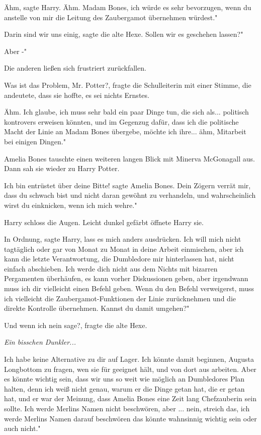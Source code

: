 \glqq{}Ähm\grqq{}, sagte Harry. \glqq{}Ähm. Madam Bones, ich würde es sehr
bevorzugen, wenn du anstelle von mir die Leitung des Zaubergamot übernehmen
würdest."

\glqq{}Darin sind wir uns einig\grqq{}, sagte die alte Hexe. \glqq{}Sollen wir es
geschehen lassen?"

\glqq{}Aber -"

Die anderen ließen sich frustriert zurückfallen.

\glqq{}Was ist das Problem, Mr. Potter?\grqq{}, fragte die Schulleiterin mit
einer Stimme, die andeutete, dass sie hoffte, es sei nichts Ernstes.

\glqq{}Ähm. Ich glaube, ich muss sehr bald ein paar Dinge tun, die sich als...
politisch kontrovers erweisen könnten, und im Gegenzug dafür, dass ich die
politische Macht der Linie an Madam Bones übergebe, möchte ich ihre... ähm,
Mitarbeit bei einigen Dingen."

Amelia Bones tauschte einen weiteren langen Blick mit Minerva McGonagall aus.
Dann sah sie wieder zu Harry Potter.

\glqq{}Ich bin entrüstet über deine Bitte!\grqq{} sagte Amelia Bones. \glqq{}Dein
Zögern verrät mir, dass du schwach bist und nicht daran gewöhnt zu verhandeln,
und wahrscheinlich wirst du einknicken, wenn ich mich wehre."

Harry schloss die Augen. Leicht dunkel gefärbt öffnete Harry sie.

\glqq{}In Ordnung\grqq{}, sagte Harry, \glqq{}lass es mich anders ausdrücken. Ich
will mich nicht tagtäglich oder gar von Monat zu Monat in deine Arbeit
einmischen, aber ich kann die letzte Verantwortung, die Dumbledore mir
hinterlassen hat, nicht einfach abschieben. Ich werde dich nicht aus dem Nichts
mit bizarren Pergamenten überhäufen, es kann vorher Diskussionen geben, aber
irgendwann muss ich dir vielleicht einen Befehl geben. Wenn du den Befehl
verweigerst, muss ich vielleicht die Zaubergamot-Funktionen der Linie
zurücknehmen und die direkte Kontrolle übernehmen. Kannst du damit umgehen?"

\glqq{}Und wenn ich nein sage?\grqq{}, fragte die alte Hexe.

\emph{Ein bisschen Dunkler...}

\glqq{}Ich habe keine Alternative zu dir auf Lager. Ich könnte damit beginnen,
Augusta Longbottom zu fragen, wen sie für geeignet hält, und von dort aus
arbeiten. Aber es könnte wichtig sein, dass wir uns so weit wie möglich an
Dumbledores Plan halten, denn ich weiß nicht genau, warum er die Dinge getan
hat, die er getan hat, und er war der Meinung, dass Amelia Bones eine Zeit lang
Chefzauberin sein sollte. Ich werde Merlins Namen nicht beschwören, aber ...
nein, streich das, ich werde Merlins Namen darauf beschwören das könnte
wahnsinnig wichtig sein oder auch nicht."

